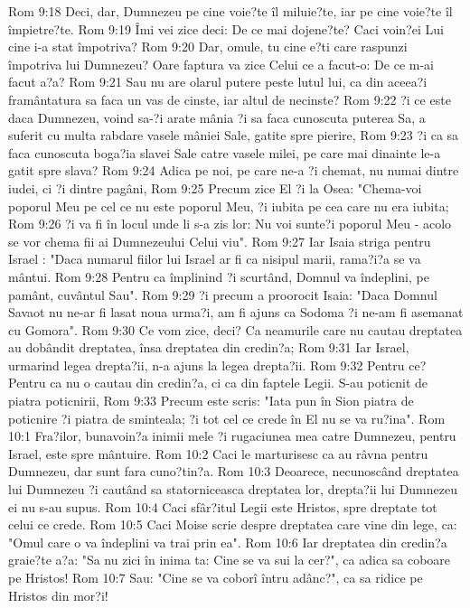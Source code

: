 Rom 9:18  Deci, dar, Dumnezeu pe cine voie?te îl miluie?te, iar pe cine voie?te îl împietre?te.
Rom 9:19  Îmi vei zice deci: De ce mai dojene?te? Caci voin?ei Lui cine i-a stat împotriva?
Rom 9:20  Dar, omule, tu cine e?ti care raspunzi împotriva lui Dumnezeu? Oare faptura va zice Celui ce a facut-o: De ce m-ai facut a?a?
Rom 9:21  Sau nu are olarul putere peste lutul lui, ca din aceea?i framântatura sa faca un vas de cinste, iar altul de necinste?
Rom 9:22  ?i ce este daca Dumnezeu, voind sa-?i arate mânia ?i sa faca cunoscuta puterea Sa, a suferit cu multa rabdare vasele mâniei Sale, gatite spre pierire,
Rom 9:23  ?i ca sa faca cunoscuta boga?ia slavei Sale catre vasele milei, pe care mai dinainte le-a gatit spre slava?
Rom 9:24  Adica pe noi, pe care ne-a ?i chemat, nu numai dintre iudei, ci ?i dintre pagâni,
Rom 9:25  Precum zice El ?i la Osea: "Chema-voi poporul Meu pe cel ce nu este poporul Meu, ?i iubita pe cea care nu era iubita;
Rom 9:26  ?i va fi în locul unde li s-a zis lor: Nu voi sunte?i poporul Meu - acolo se vor chema fii ai Dumnezeului Celui viu".
Rom 9:27  Iar Isaia striga pentru Israel : "Daca numarul fiilor lui Israel ar fi ca nisipul marii, rama?i?a se va mântui.
Rom 9:28  Pentru ca împlinind ?i scurtând, Domnul va îndeplini, pe pamânt, cuvântul Sau".
Rom 9:29  ?i precum a proorocit Isaia: "Daca Domnul Savaot nu ne-ar fi lasat noua urma?i, am fi ajuns ca Sodoma ?i ne-am fi asemanat cu Gomora".
Rom 9:30  Ce vom zice, deci? Ca neamurile care nu cautau dreptatea au dobândit dreptatea, însa dreptatea din credin?a;
Rom 9:31  Iar Israel, urmarind legea drepta?ii, n-a ajuns la legea drepta?ii.
Rom 9:32  Pentru ce? Pentru ca nu o cautau din credin?a, ci ca din faptele Legii. S-au poticnit de piatra poticnirii,
Rom 9:33  Precum este scris: "Iata pun în Sion piatra de poticnire ?i piatra de sminteala; ?i tot cel ce crede în El nu se va ru?ina".
Rom 10:1  Fra?ilor, bunavoin?a inimii mele ?i rugaciunea mea catre Dumnezeu, pentru Israel, este spre mântuire.
Rom 10:2  Caci le marturisesc ca au râvna pentru Dumnezeu, dar sunt fara cuno?tin?a.
Rom 10:3  Deoarece, necunoscând dreptatea lui Dumnezeu ?i cautând sa statorniceasca dreptatea lor, drepta?ii lui Dumnezeu ei nu s-au supus.
Rom 10:4  Caci sfâr?itul Legii este Hristos, spre dreptate tot celui ce crede.
Rom 10:5  Caci Moise scrie despre dreptatea care vine din lege, ca: "Omul care o va îndeplini va trai prin ea".
Rom 10:6  Iar dreptatea din credin?a graie?te a?a: "Sa nu zici în inima ta: Cine se va sui la cer?", ca adica sa coboare pe Hristos!
Rom 10:7  Sau: "Cine se va coborî întru adânc?", ca sa ridice pe Hristos din mor?i!
